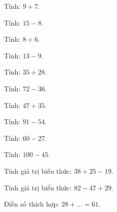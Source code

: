 \begin{ex}
Tính: $9 + 7$.
\end{ex}

\begin{ex}
Tính: $15 - 8$.
\end{ex}

\begin{ex}
Tính: $8 + 6$.
\end{ex}

\begin{ex}
Tính: $13 - 9$.
\end{ex}

\begin{ex}
Tính: $35 + 28$.
\end{ex}

\begin{ex}
Tính: $72 - 36$.
\end{ex}

\begin{ex}
Tính: $47 + 35$.
\end{ex}

\begin{ex}
Tính: $91 - 54$.
\end{ex}

\begin{ex}
Tính: $60 - 27$.
\end{ex}

\begin{ex}
Tính: $100 - 45$.
\end{ex}

\begin{ex}
Tính giá trị biểu thức: $38 + 25 - 19$.
\end{ex}

\begin{ex}
Tính giá trị biểu thức: $82 - 47 + 29$.
\end{ex}

\begin{ex}
Điền số thích hợp: $28 + \dots = 61$.
\end{ex}

